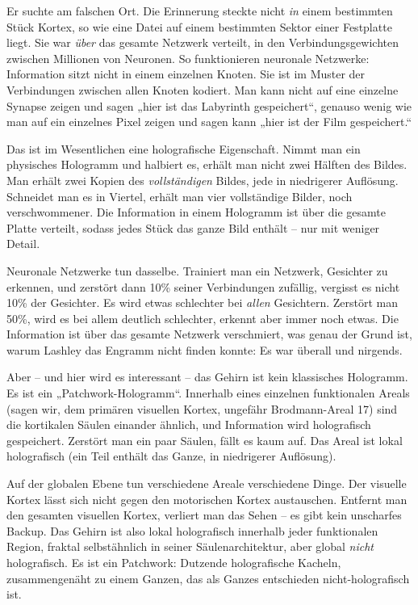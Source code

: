 \documentclass[11pt, twoside, openright]{book}
\begin{document}
Er suchte am falschen Ort. Die Erinnerung steckte nicht \textit{in} einem bestimmten Stück Kortex, so wie eine Datei auf einem bestimmten Sektor einer Festplatte liegt. Sie war \textit{über} das gesamte Netzwerk verteilt, in den Verbindungsgewichten zwischen Millionen von Neuronen. So funktionieren neuronale Netzwerke: Information sitzt nicht in einem einzelnen Knoten. Sie ist im Muster der Verbindungen zwischen allen Knoten kodiert. Man kann nicht auf eine einzelne Synapse zeigen und sagen „hier ist das Labyrinth gespeichert“, genauso wenig wie man auf ein einzelnes Pixel zeigen und sagen kann „hier ist der Film gespeichert.“

Das ist im Wesentlichen eine holografische Eigenschaft. Nimmt man ein physisches Hologramm und halbiert es, erhält man nicht zwei Hälften des Bildes. Man erhält zwei Kopien des \textit{vollständigen} Bildes, jede in niedrigerer Auflösung. Schneidet man es in Viertel, erhält man vier vollständige Bilder, noch verschwommener. Die Information in einem Hologramm ist über die gesamte Platte verteilt, sodass jedes Stück das ganze Bild enthält -- nur mit weniger Detail.

Neuronale Netzwerke tun dasselbe. Trainiert man ein Netzwerk, Gesichter zu erkennen, und zerstört dann 10\% seiner Verbindungen zufällig, vergisst es nicht 10\% der Gesichter. Es wird etwas schlechter bei \textit{allen} Gesichtern. Zerstört man 50\%, wird es bei allem deutlich schlechter, erkennt aber immer noch etwas. Die Information ist über das gesamte Netzwerk verschmiert, was genau der Grund ist, warum Lashley das Engramm nicht finden konnte: Es war überall und nirgends.

Aber -- und hier wird es interessant -- das Gehirn ist kein klassisches Hologramm. Es ist ein „Patchwork-Hologramm“. Innerhalb eines einzelnen funktionalen Areals (sagen wir, dem primären visuellen Kortex, ungefähr Brodmann-Areal 17) sind die kortikalen Säulen einander ähnlich, und Information wird holografisch gespeichert. Zerstört man ein paar Säulen, fällt es kaum auf. Das Areal ist lokal holografisch (ein Teil enthält das Ganze, in niedrigerer Auflösung).

Auf der globalen Ebene tun verschiedene Areale verschiedene Dinge. Der visuelle Kortex lässt sich nicht gegen den motorischen Kortex austauschen. Entfernt man den gesamten visuellen Kortex, verliert man das Sehen -- es gibt kein unscharfes Backup. Das Gehirn ist also lokal holografisch innerhalb jeder funktionalen Region, fraktal selbstähnlich in seiner Säulenarchitektur, aber global \textit{nicht} holografisch. Es ist ein Patchwork: Dutzende holografische Kacheln, zusammengenäht zu einem Ganzen, das als Ganzes entschieden nicht-holografisch ist.
\end{document}
